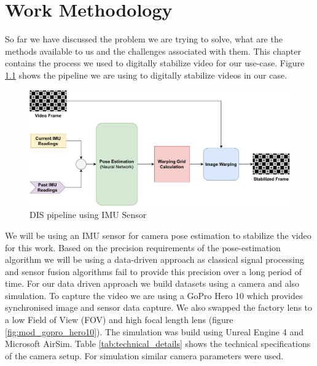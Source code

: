 \chapter{Work Methodology} \label{chapter_four}

So far we have discussed the problem we are trying to solve, what are the methods available to us and the challenges associated with them. This chapter contains the process we used to digitally stabilize video for our use-case. Figure \ref{fig:dis_pipeline} shows the pipeline we are using to digitally stabilize videos in our case.


\begin{figure}[H]
    \includegraphics[scale=0.6]{images/fig_chapter4/dis_pipleline.pdf}
    \caption{DIS pipeline using IMU Sensor}
    \label{fig:dis_pipeline}
\end{figure}

We will be using an IMU sensor for camera pose estimation to stabilize the video for this work. Based on the precision requirements of the pose-estimation algorithm we will be using a data-driven approach as classical signal processing and sensor fusion algorithms fail to provide this precision over a long period of time. For our data driven approach we build datasets using a camera and also simulation. To capture the video we are using a GoPro Hero 10 which provides synchronised image and sensor data capture. We also swapped the factory lens to a low Field of View (FOV) and high focal length lens (figure \ref{fig:mod_gopro_hero10}). The simulation was build using Unreal Engine 4 and Microsoft AirSim. Table \ref{tab:technical_details} shows the technical specifications of the camera setup. For simulation similar camera parameters were used.

